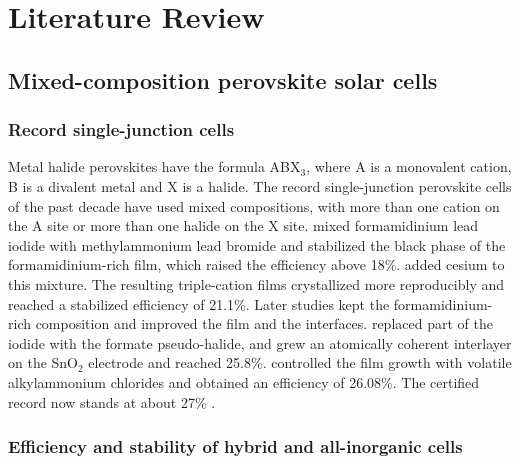 
\chapter{Literature Review}
\label{ch:review}

\section{Mixed-composition perovskite solar cells}
\label{sec:mixed}

\subsection{Record single-junction cells}

Metal halide perovskites have the formula ABX$_3$, where A is a monovalent cation, B is a divalent metal and X is a halide. The record single-junction perovskite cells of the past decade have used mixed compositions, with more than one cation on the A site or more than one halide on the X site. \citet{Jeon2015} mixed formamidinium lead iodide with methylammonium lead bromide and stabilized the black phase of the formamidinium-rich film, which raised the efficiency above 18\%. \citet{Saliba2016} added cesium to this mixture. The resulting triple-cation films crystallized more reproducibly and reached a stabilized efficiency of 21.1\%. Later studies kept the formamidinium-rich composition and improved the film and the interfaces. \citet{Jeong2021} replaced part of the iodide with the formate pseudo-halide, and \citet{Min2021} grew an atomically coherent interlayer on the SnO$_2$ electrode and reached 25.8\%. \citet{Park2023} controlled the film growth with volatile alkylammonium chlorides and obtained an efficiency of 26.08\%. The certified record now stands at about 27\% \citep{NREL2026}.

\subsection{Efficiency and stability of hybrid and all-inorganic cells}

